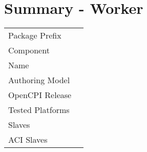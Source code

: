 \section*{Summary - \Comp{} Worker}
\begin{longtable}{|p{}
                  |p{}|}
  \hline
  \rowcolor{blue}
  &                                     \\
  \hline
  Package Prefix   & \packageprefix{}   \\
  \hline
  Component        & \component{}       \\
  \hline
  Name             & \comp{}            \\
  \hline
  Authoring Model  & \authoringmodel{}  \\
  \hline
  OpenCPI Release  & \version{}         \\
  \hline
  Tested Platforms & \testedplatforms{} \\
  \hline
  Slaves           & \slaves{}          \\
  \hline
  ACI Slaves       & \acislaves{}       \\
  \hline
\end{longtable}
